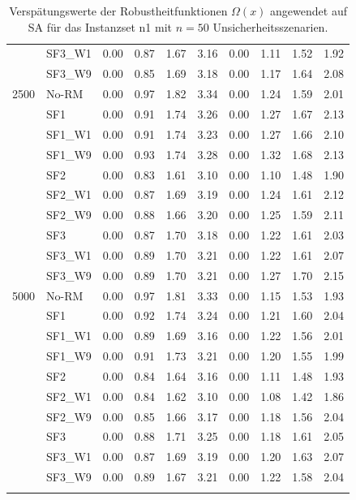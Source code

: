 {\begin{longtable}{ll|rrrr|rrrr}
     & SF3\_W1 & 0.00 & 0.87 & 1.67 & 3.16 & 0.00 & 1.11 & 1.52 & 1.92 \\
     & SF3\_W9 & 0.00 & 0.85 & 1.69 & 3.18 & 0.00 & 1.17 & 1.64 & 2.08 \\ \hline
2500 & No-RM & 0.00 & 0.97 & 1.82 & 3.34 & 0.00 & 1.24 & 1.59 & 2.01 \\
     & SF1 & 0.00 & 0.91 & 1.74 & 3.26 & 0.00 & 1.27 & 1.67 & 2.13 \\
     & SF1\_W1 & 0.00 & 0.91 & 1.74 & 3.23 & 0.00 & 1.27 & 1.66 & 2.10 \\
     & SF1\_W9 & 0.00 & 0.93 & 1.74 & 3.28 & 0.00 & 1.32 & 1.68 & 2.13 \\
     & SF2 & 0.00 & 0.83 & 1.61 & 3.10 & 0.00 & 1.10 & 1.48 & 1.90 \\
     & SF2\_W1 & 0.00 & 0.87 & 1.69 & 3.19 & 0.00 & 1.24 & 1.61 & 2.12 \\
     & SF2\_W9 & 0.00 & 0.88 & 1.66 & 3.20 & 0.00 & 1.25 & 1.59 & 2.11 \\
     & SF3 & 0.00 & 0.87 & 1.70 & 3.18 & 0.00 & 1.22 & 1.61 & 2.03 \\
     & SF3\_W1 & 0.00 & 0.89 & 1.70 & 3.21 & 0.00 & 1.22 & 1.61 & 2.07 \\
     & SF3\_W9 & 0.00 & 0.89 & 1.70 & 3.21 & 0.00 & 1.27 & 1.70 & 2.15 \\ \hline
5000 & No-RM & 0.00 & 0.97 & 1.81 & 3.33 & 0.00 & 1.15 & 1.53 & 1.93 \\
     & SF1 & 0.00 & 0.92 & 1.74 & 3.24 & 0.00 & 1.21 & 1.60 & 2.04 \\
     & SF1\_W1 & 0.00 & 0.89 & 1.69 & 3.16 & 0.00 & 1.22 & 1.56 & 2.01 \\
     & SF1\_W9 & 0.00 & 0.91 & 1.73 & 3.21 & 0.00 & 1.20 & 1.55 & 1.99 \\
     & SF2 & 0.00 & 0.84 & 1.64 & 3.16 & 0.00 & 1.11 & 1.48 & 1.93 \\
     & SF2\_W1 & 0.00 & 0.84 & 1.62 & 3.10 & 0.00 & 1.08 & 1.42 & 1.86 \\
     & SF2\_W9 & 0.00 & 0.85 & 1.66 & 3.17 & 0.00 & 1.18 & 1.56 & 2.04 \\
     & SF3 & 0.00 & 0.88 & 1.71 & 3.25 & 0.00 & 1.18 & 1.61 & 2.05 \\
     & SF3\_W1 & 0.00 & 0.87 & 1.69 & 3.19 & 0.00 & 1.20 & 1.63 & 2.07 \\
     & SF3\_W9 & 0.00 & 0.89 & 1.67 & 3.21 & 0.00 & 1.22 & 1.58 & 2.04 \\
\bottomrule
\caption{Verspätungswerte der Robustheitfunktionen $\Omega(x)$ angewendet auf \acs{SA} für das Instanzset n1 mit $n = 50$ Unsicherheitsszenarien. }
\label{tab:evaluation_robustness_n1_sa}
\end{longtable}
}
\vspace*{-25px}
\begin{figure}[H]
\end{figure}

